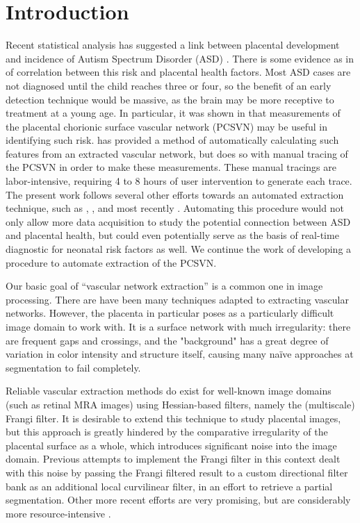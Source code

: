 \chapter{Introduction} \label{ch:introduction}

Recent statistical analysis has suggested a link between placental development and incidence of
Autism Spectrum Disorder (ASD) \autocite{chang2017}. There is some evidence as in \autocite{chang2016whole}
of correlation between this risk and placental health factors. Most ASD
cases are not diagnosed until the child reaches three or four, so the benefit
of an early detection technique would be massive, as the brain may be more
receptive to treatment at a young age. In particular, it was shown in
\autocite{chang2016whole} that measurements of the placental chorionic surface
vascular network (PCSVN) may be useful in identifying such risk.
\autocite{chang2017} has provided a method of automatically calculating such
features from an extracted vascular network, but does so with manual tracing of
the PCSVN in order to make these measurements.  These manual tracings are
labor-intensive, requiring 4 to 8 hours of user intervention to generate each trace.
The present work follows several other efforts towards an automated extraction
technique, such as \autocite{almoussa-ucla-reu}, \autocite{huynh2013filter}, and
most recently \autocite{djima2017enhancing}. Automating this procedure would not
only allow more data acquisition to study the potential connection between ASD
and placental health, but could even potentially serve as the basis of real-time
diagnostic for neonatal risk factors as well. We continue the work of
developing a procedure to automate extraction of the PCSVN.


Our basic goal of ``vascular network extraction'' is a common one in image
processing. There are have been many techniques adapted to extracting vascular
networks. However, the placenta in particular poses as a particularly difficult
image domain to work with. It is a surface network with much irregularity: there are
frequent gaps and crossings, and the "background" has a great degree of variation in
color intensity and structure itself, causing many na\"{i}ve
approaches at segmentation to fail completely.

Reliable vascular extraction methods do exist for well-known image domains
(such as retinal MRA images) using Hessian-based filters, namely the (multiscale) Frangi filter.
It is desirable to extend this technique to study placental images, but this
approach is greatly hindered by the comparative irregularity of the placental
surface as a whole, which introduces significant noise into the image domain.
Previous attempts to implement the Frangi filter in this context \autocite{huynh2013filter}
dealt with this noise by passing the Frangi filtered result to a custom directional filter bank
as an additional local curvilinear filter, in an effort to retrieve a partial
segmentation. Other more recent efforts are very promising,
but are considerably more resource-intensive \autocite{djima2017enhancing}.

